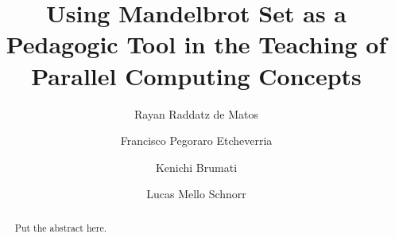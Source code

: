 \documentclass[final,12pt]{elsarticle}
\date{}
\title{Using Mandelbrot Set as a Pedagogic Tool in the Teaching of Parallel Computing Concepts}
\begin{document}

\author[UFRGS]{Rayan Raddatz de Matos}


\author[UFRGS]{Francisco Pegoraro Etcheverria}


\author[UFRGS]{Kenichi Brumati}



\author[UFRGS]{Lucas Mello Schnorr}

\address[UFRGS]{
Institute of Informatics, Federal University of Rio Grande do Sul -- UFRGS\\
91501-970, Porto Alegre, RS -- Brazil\\
}
\begin{abstract}

Put the abstract here.

\end{abstract}


\begin{keyword}




\end{keyword}
\maketitle
\end{document}
